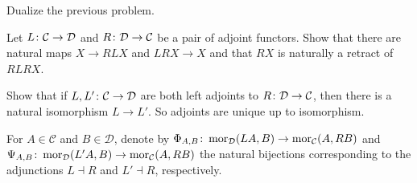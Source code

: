 \bs
\es

\bp
Dualize the previous problem.
\ep

\bs
\es

\bp
Let $L \colon \mathcal{C} \to \mathcal{D}$ and $R \colon\mathcal{D} \to \mathcal{C}$ be a pair of adjoint functors. Show that there are natural maps $X \to RLX$ and $LRX \to X$ and that $RX$ is naturally a retract of $RLRX$.
\ep

\bs
\es

\begin{extrap}
Show that if $L, L' \colon \mathcal{C} \to \mathcal{D}$ are both left adjoints to $R \colon \mathcal{D}\to\mathcal{C}$, then there is a natural isomorphism $L \to L'$. So adjoints are unique up to isomorphism.
\end{extrap}

\bs
For $A\in \mathcal{C}$ and $B\in\mathcal{D}$, denote by $\Phi_{A,B}\colon\operatorname{mor}_{\mathcal{D}}(LA,B)\to\operatorname{mor}_{\mathcal{C}}(A,RB)$ and $\Psi_{A,B}\colon\operatorname{mor}_{\mathcal{D}}(L'A,B)\to\operatorname{mor}_{\mathcal{C}}(A,RB)$ the natural bijections corresponding to the adjunctions $L\dashv R$ and $L'\dashv R$, respectively.

